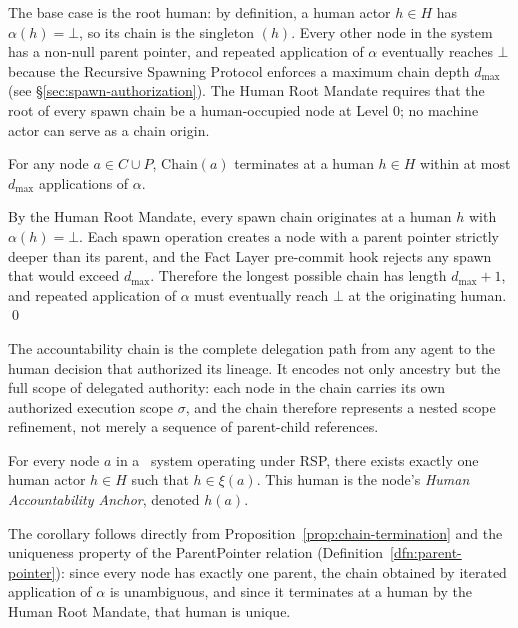 The base case is the root human: by definition, a human actor $h \in H$ has $\alpha(h) = \bot$, so its chain is the singleton $(h)$. Every other node in the system has a non-null parent pointer, and repeated application of $\alpha$ eventually reaches $\bot$ because the Recursive Spawning Protocol enforces a maximum chain depth $d_{\max}$ (see \S\ref{sec:spawn-authorization}). The Human Root Mandate requires that the root of every spawn chain be a human-occupied node at Level 0; no machine actor can serve as a chain origin.

\begin{prop}
\label{prop:chain-termination}
For any node $a \in C \cup P$, $\mathrm{Chain}(a)$ terminates at a human $h \in H$ within at most $d_{\max}$ applications of $\alpha$.
\end{prop}

\begin{prf}
By the Human Root Mandate, every spawn chain originates at a human $h$ with $\alpha(h) = \bot$. Each spawn operation creates a node with a parent pointer strictly deeper than its parent, and the Fact Layer pre-commit hook rejects any spawn that would exceed $d_{\max}$. Therefore the longest possible chain has length $d_{\max} + 1$, and repeated application of $\alpha$ must eventually reach $\bot$ at the originating human. \qed
\end{prf}

The accountability chain is the complete delegation path from any agent to the human decision that authorized its lineage. It encodes not only ancestry but the full scope of delegated authority: each node in the chain carries its own authorized execution scope $\sigma$, and the chain therefore represents a nested scope refinement, not merely a sequence of parent-child references.

\begin{corol}
For every node $a$ in a \bxthree\ system operating under RSP, there exists exactly one human actor $h \in H$ such that $h \in \xi(a)$. This human is the node's \emph{Human Accountability Anchor}, denoted $h(a)$.
\end{corol}

The corollary follows directly from Proposition~\ref{prop:chain-termination} and the uniqueness property of the ParentPointer relation (Definition~\ref{dfn:parent-pointer}): since every node has exactly one parent, the chain obtained by iterated application of $\alpha$ is unambiguous, and since it terminates at a human by the Human Root Mandate, that human is unique.

